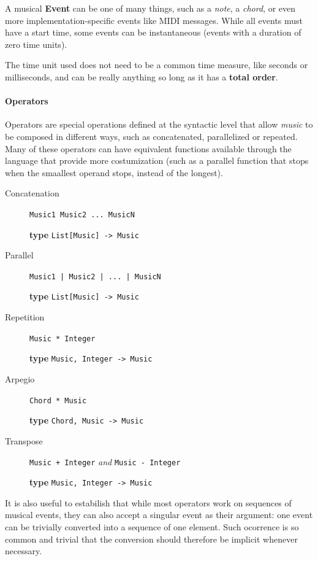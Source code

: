 \documentclass[a4paper,UKenglish,cleveref, autoref]{oasics-v2019}
\begin{document}
A musical \textbf{Event} can be one of many things, such as a \textit{note}, a \textit{chord}, or even more implementation-specific events like MIDI messages\cite{Loy1985MusiciansMA}. While all events must have a start time, some events can be instantaneous (events with a duration of zero time units).

The time unit used does not need to be a common time measure, like seconds or milliseconds, and can be really anything so long as it has a \textbf{total order}.

\paragraph*{Operators}
Operators are special operations defined at the syntactic level that allow \textit{music} to be composed in different ways, such as concatenated, parallelized or repeated. Many of these operators can have equivalent functions available through the language that provide more costumization (such as a parallel function that stops when the smaallest operand stops, instead of the longest).

\begin{description}
    \item[Concatenation] \verb|Music1 Music2 ... MusicN|
    
        \textbf{type} \verb|List[Music] -> Music|
    \item[Parallel] \verb'Music1 | Music2 | ... | MusicN'
        
        \textbf{type} \verb|List[Music] -> Music|
    \item[Repetition] \verb'Music * Integer'
    
        \textbf{type} \verb|Music, Integer -> Music|
    \item[Arpegio] \verb'Chord * Music'
        
        \textbf{type} \verb|Chord, Music -> Music|
    \item[Transpose] \verb'Music + Integer' \textit{and} \verb'Music - Integer'
    
        \textbf{type} \verb|Music, Integer -> Music|
\end{description}


It is also useful to estabilish that while most operators work on sequences of musical events, they can also accept a singular event as their argument: one event can be trivially converted into a sequence of one element. Such ocorrence is so common and trivial that the conversion should therefore be implicit whenever necessary.
\end{document}
